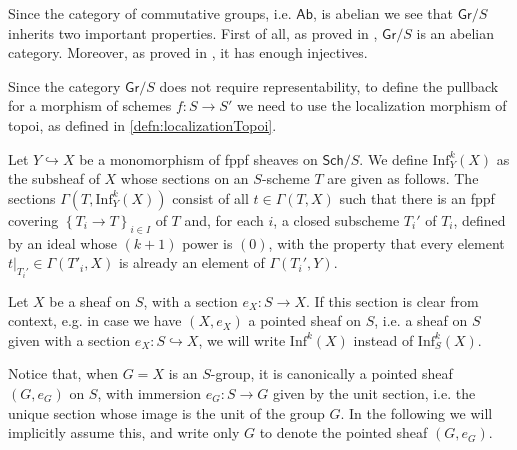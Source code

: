 \begin{rem}[]\label{rem:PropertiesGrS}
	Since the category of commutative groups, i.e. $\mathsf{Ab}$, is
	abelian we see that $\mathsf{Gr}/S$ inherits two important properties.
	First of all, as proved in 
	\cite[\href{https://stacks.math.columbia.edu/tag/03CN}{Lemma 03CN}]{SP},
	$\mathsf{Gr}/S$ is an abelian category.
	Moreover, as proved in 
	\cite[\href{https://stacks.math.columbia.edu/tag/01DP}{Theorem 01DP}]{SP},
	it has enough injectives.
\end{rem}


\begin{rem}[]
	Since the category $\mathsf{Gr}/S$ does not require representability,
	to define the pullback for a morphism of schemes $f\colon S \to S'$
	we need to use the localization morphism of topoi, as defined in
	\cref{defn:localizationTopoi}.
\end{rem}


\begin{defn}\label{defn:kInfNeighbourhood}
	Let $Y \hookrightarrow X$ be a monomorphism of fppf sheaves on \(\mathsf{Sch}/S\).
	We define $\mathrm{Inf}_Y^k(X)$ as the subsheaf of $X$
	whose sections on an $S$-scheme $T$
	are given as follows.
	The sections $\Gamma ( T , \mathrm{Inf}_Y^k(X) )$ consist of all
	$t \in \Gamma \left( T, X \right)$ such that
	there is an fppf covering $\left\{ T_{ i } \to T \right\}_{ i \in I }$
	of $T$ and, for each $i$, a closed subscheme $T_i'$ of $T_i$,
	defined by an ideal whose $(k+1)$ power is $(0)$,
	with the property that every element $\left.t\right|_{T_i'} \in \Gamma(T'_i, X)$
	is already an element of $\Gamma(T_i', Y)$.
\end{defn}


\begin{ntt}
	Let $X$ be a sheaf on $S$, with a section $e_X\colon S \to X$.
	If this section is clear from context, e.g. in case we have
	$(X, e_X)$ a pointed sheaf on $S$, i.e. a sheaf on $S$
	given with a section $e_X\colon S \hookrightarrow X$,
	we will write $\mathrm{Inf}^k(X)$
	instead of $\mathrm{Inf}_S^k(X)$.
\end{ntt}


\begin{rem}[]
	Notice that, when $G = X$ is an $S$-group, it is canonically a
	pointed sheaf $\left(G, e_G\right)$ on $S$, with immersion $e_G\colon S \to G$
	given by the unit section, i.e. the unique section whose image
	is the unit of the group $G$.
	In the following we will implicitly assume this, and write only
	$G$ to denote the pointed sheaf $(G, e_G)$.
\end{rem}


